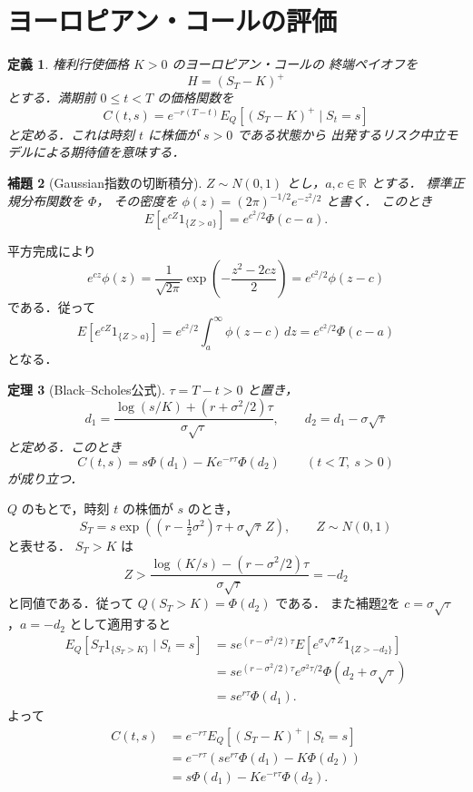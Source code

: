 \documentclass[a5paper,10pt,onecolumn]{jsarticle}
\makeatletter
\theoremstyle{mathnotetheorem}
\newtheorem{theorem}{定理}[section]
\newtheorem{definition}[theorem]{定義}
\newtheorem{lemma}[theorem]{補題}
\renewcommand{\proofname}{証明}
\renewenvironment{proof}[1][\proofname]{%
  \par\pushQED{\qed}\normalfont\topsep4\p@\@plus2\p@\relax
  \trivlist\item[\hskip\labelsep\bfseries #1]\ignorespaces
}{\popQED\endtrivlist\@endpefalse}
\makeatother
\begin{document}
\section{ヨーロピアン・コールの評価}

\begin{definition}
権利行使価格 $K>0$ のヨーロピアン・コールの
終端ペイオフを
\[
 H=(S_T-K)^+
\]
とする．満期前 $0\le t<T$ の価格関数を
\[
 C(t,s)=e^{-r(T-t)}
 E_Q[(S_T-K)^+\mid S_t=s]
\]
と定める．これは時刻 $t$ に株価が $s>0$ である状態から
出発するリスク中立モデルによる期待値を意味する．
\end{definition}

\begin{lemma}[Gaussian指数の切断積分]\label{lem:gaussian}
$Z\sim N(0,1)$ とし，$a,c\in\mathbb R$ とする．
標準正規分布関数を $\Phi$，
その密度を
$\phi(z)=(2\pi)^{-1/2}e^{-z^2/2}$ と書く．
このとき
\[
 E[e^{cZ}1_{\{Z>a\}}]
 =e^{c^2/2}\Phi(c-a).
\]
\end{lemma}
\begin{proof}
平方完成により
\[
 e^{cz}\phi(z)
 =\frac1{\sqrt{2\pi}}
   \exp\!\left(-\frac{z^2-2cz}{2}\right)
 =e^{c^2/2}\phi(z-c)
\]
である．従って
\[
 E[e^{cZ}1_{\{Z>a\}}]
 =e^{c^2/2}\int_a^\infty\phi(z-c)\,dz
 =e^{c^2/2}\Phi(c-a)
\]
となる．
\end{proof}

\begin{theorem}[Black--Scholes公式]\label{thm:bs-formula}
$\tau=T-t>0$ と置き，
\[
 d_1=\frac{\log(s/K)+(r+\sigma^2/2)\tau}{\sigma\sqrt\tau},
 \qquad
 d_2=d_1-\sigma\sqrt\tau
\]
と定める．このとき
\[
 C(t,s)=s\Phi(d_1)-Ke^{-r\tau}\Phi(d_2)
 \qquad(t<T,\ s>0)
\]
が成り立つ．
\end{theorem}
\begin{proof}
$Q$ のもとで，時刻 $t$ の株価が $s$ のとき，
\[
 S_T=s\exp\!\left(
 (r-\tfrac12\sigma^2)\tau+\sigma\sqrt\tau\,Z\right),
 \qquad Z\sim N(0,1)
\]
と表せる．
$S_T>K$ は
\[
 Z>\frac{\log(K/s)-(r-\sigma^2/2)\tau}
          {\sigma\sqrt\tau}=-d_2
\]
と同値である．従って
$Q(S_T>K)=\Phi(d_2)$ である．
また補題\ref{lem:gaussian}を
$c=\sigma\sqrt\tau$，$a=-d_2$ として適用すると
\begin{align*}
 E_Q[S_T1_{\{S_T>K\}}\mid S_t=s]
 &=s e^{(r-\sigma^2/2)\tau}
   E[e^{\sigma\sqrt\tau Z}1_{\{Z>-d_2\}}]\\
 &=s e^{(r-\sigma^2/2)\tau}
   e^{\sigma^2\tau/2}\Phi(d_2+\sigma\sqrt\tau)\\
 &=s e^{r\tau}\Phi(d_1).
\end{align*}
よって
\begin{align*}
 C(t,s)
 &=e^{-r\tau}E_Q[(S_T-K)^+\mid S_t=s]\\
 &=e^{-r\tau}
 \left(s e^{r\tau}\Phi(d_1)-K\Phi(d_2)\right)\\
 &=s\Phi(d_1)-Ke^{-r\tau}\Phi(d_2).
\end{align*}
\end{proof}
\end{document}
